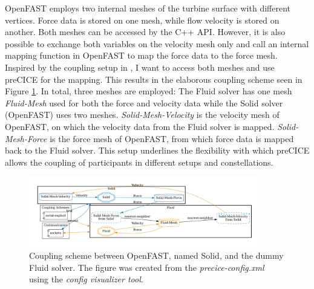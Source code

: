 OpenFAST employs two internal meshes of the turbine surface with different vertices. Force data is stored on one mesh, while flow velocity is stored on another. Both meshes can be accessed by the C++ API. However, it is also possible to exchange both variables on the velocity mesh only and call an internal mapping function in OpenFAST to map the force data to the force mesh. Inspired by the coupling setup in \cite{Taschner:2022}, I want to access both meshes and use preCICE for the mapping. This results in the elaborous coupling scheme seen in Figure \ref{fig:openfast:coupling}. In total, three meshes are employed: The Fluid solver has one mesh \textit{Fluid-Mesh} used for both the force and velocity data while the Solid solver (OpenFAST) uses two meshes. \textit{Solid-Mesh-Velocity} is the velocity mesh of OpenFAST, on which the velocity data from the Fluid solver is mapped. \textit{Solid-Mesh-Force} is the force mesh of OpenFAST, from which force data is mapped back to the Fluid solver. This setup underlines the flexibility with which preCICE allows the coupling of participants in different setups and constellations.

\begin{figure}[h]
	\centering
	\includegraphics[width=0.9\textwidth]{images/openfast-dummy-coupling-scheme.png}
	\caption{Coupling scheme between OpenFAST, named Solid, and the dummy Fluid solver. The figure was created from the \textit{precice-config.xml} using the \textit{config visualizer tool}\protect\footnotemark.}
	\label{fig:openfast:coupling}
\end{figure}


